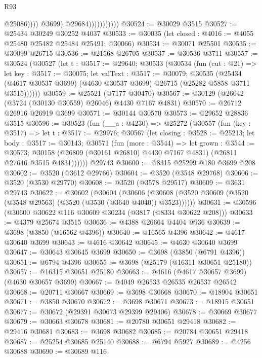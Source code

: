 \begin{lexlean}{R93}
\begin{coremodule}
                                    @25086))))
                            @3699)
                          @29684)))))))))))
@30524 := @30029 @3515
@30527 := @25434 @30249 @30252 @4037
@30533 := @30035 (let closed : @4016 := @4055 @25480 @25482 @25484 @25491; @30066)
@30534 := @30071 @25501
@30535 := @30099 @26715
@30536 := @21568 @26705
@30537 := @30536 @3711
@30557 := @30524
    (@30527
      (let t : @3517 := @29640;
      @30533
        (@30534
          (fun (cut : @21) =>
          let key : @3517 := @30075;
          let valText : @3517 := @30079;
          @30535
            (@25434 (@4617 @30537 @3699) (@4630 @30537 @3699) @26715 (@25282 @5858 @3711 @3515))))))
@30559 := @25521 (@7177 @30470)
@30567 := @30129 (@26042 (@3724 (@30130 @30559) @26046) @4430 @7167 @4831)
@30570 := @26712 @26916 @26919 @3699
@30571 := @30144 @30570
@30573 := @29652 @28836 @3515
@30596 := @30523
    (fun (__a : @4230) =>
    @25272
      (@30557
        (fun (key : @3517) =>
        let t : @3517 := @29976;
        @30567
          (let closing : @3528 := @25213;
          let body : @3517 := @30143;
          @30571
            (fun (more : @3544) =>
            let grown : @3544 := @30573;
            @30158 (@26809 (@30161 @26810) @4430 @7167 @4831) (@26811 @27646 @3515 @4831))))))
    @29743
@30600 := @8315 @25299 @180 @3699 @208
@30602 := @3520 (@3612 @29766)
@30604 := @3520 (@3548 @29768)
@30606 := @3520 (@3530 @29770)
@30608 := @3520 (@3578 @29517)
@30609 := @3631 @29743
@30622 := @30602
    (@30604
      (@30606 (@30608 (@3520 @30609 (@3520 (@3548 @29563) (@3520 (@3530 (@3640 @4040)) @3523))))))
@30631 := @30596 (@30600 @30622 @116 @30609 @30234 (@3817 (@8334 @30622 @208)))
@30633 := @4379 @25674 @3515
@30636 := @4388 @26664 @4404 @936
@30639 := @3698 (@3850 (@16562 @4396))
@30640 := @16565 @4396
@30642 := @4617 @30640 @3699
@30643 := @4616 @30642
@30645 := @4630 @30640 @3699
@30647 := @30643 @30645 @3699
@30650 := @3698 (@3850 (@6791 @4396))
@30651 := @6794 @4396
@30655 := @3698 (@25179 (@16311 @30651 @25180))
@30657 := @16315 @30651 @25180
@30663 := @4616 (@4617 @30657 @3699) (@4630 @30657 @3699)
@30667 := @4049 @26533 @26535 @26537 @26542
@30668 := @20711 @30667
@30669 := @3698 @30668
@30670 := @18904 @30651
@30671 := @3850 @30670
@30672 := @3698 @30671
@30673 := @18915 @30651
@30677 := @30672 (@29391 @30673 @29399 @29406)
@30678 := @30669 @30677
@30679 := @30663 @30678
@30681 := @20780 @30651 @29418
@30682 := @29416 @30681
@30683 := @3698 @30682
@30685 := @20784 @30651 @29418
@30687 := @25254 @30685 @25140
@30688 := @6794 @5927
@30689 := @4256 @30688
@30690 := @30689 @116

\end{coremodule}
\end{lexlean}
